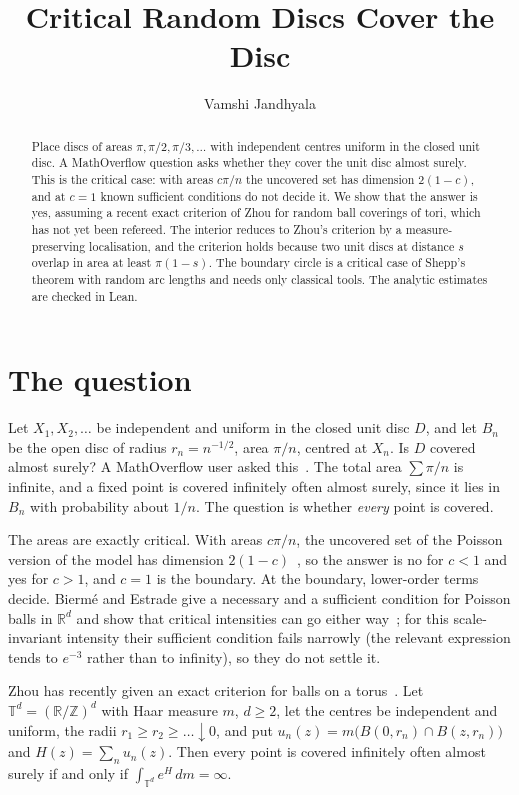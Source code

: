 \documentclass[11pt]{amsart}
\title{Critical Random Discs Cover the Disc}
\author{Vamshi Jandhyala}
\theoremstyle{remark}
\begin{document}
\begin{abstract}
Place discs of areas $\pi,\pi/2,\pi/3,\dots$ with independent centres uniform in the closed unit disc. A MathOverflow question asks whether they cover the unit disc almost surely. This is the critical case: with areas $c\pi/n$ the uncovered set has dimension $2(1-c)$, and at $c=1$ known sufficient conditions do not decide it. We show that the answer is yes, assuming a recent exact criterion of Zhou for random ball coverings of tori, which has not yet been refereed. The interior reduces to Zhou's criterion by a measure-preserving localisation, and the criterion holds because two unit discs at distance $s$ overlap in area at least $\pi(1-s)$. The boundary circle is a critical case of Shepp's theorem with random arc lengths and needs only classical tools. The analytic estimates are checked in Lean.
\end{abstract}

\maketitle

\section{The question}

Let $X_1,X_2,\dots$ be independent and uniform in the closed unit disc $D$, and let $B_n$ be the open disc of radius $r_n=n^{-1/2}$, area $\pi/n$, centred at $X_n$. Is $D$ covered almost surely? A MathOverflow user asked this~\cite{MO}. The total area $\sum\pi/n$ is infinite, and a fixed point is covered infinitely often almost surely, since it lies in $B_n$ with probability about $1/n$. The question is whether \emph{every} point is covered.

The areas are exactly critical. With areas $c\pi/n$, the uncovered set of the Poisson version of the model has dimension $2(1-c)$~\cite[Thm.~3.6]{BE}, so the answer is no for $c<1$ and yes for $c>1$, and $c=1$ is the boundary. At the boundary, lower-order terms decide. Biermé and Estrade give a necessary and a sufficient condition for Poisson balls in $\mathbb R^d$ and show that critical intensities can go either way~\cite[Props.~2.4, 2.5]{BE}; for this scale-invariant intensity their sufficient condition fails narrowly (the relevant expression tends to $e^{-3}$ rather than to infinity), so they do not settle it.

Zhou has recently given an exact criterion for balls on a torus~\cite[Thm.~2.1]{Z}. Let $\mathbb T^d=(\mathbb R/\mathbb Z)^d$ with Haar measure $m$, $d\ge2$, let the centres be independent and uniform, the radii $r_1\ge r_2\ge\dots\downarrow0$, and put $u_n(z)=m\bigl(B(0,r_n)\cap B(z,r_n)\bigr)$ and $H(z)=\sum_nu_n(z)$. Then every point is covered infinitely often almost surely if and only if $\int_{\mathbb T^d}e^{H}\,dm=\infty$.
\end{document}
